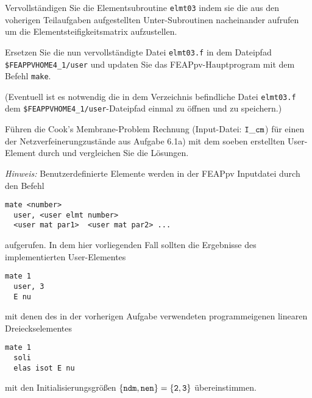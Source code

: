 \enab
\item Vervollständigen Sie die Elementsubroutine \verb|elmt03| indem sie die aus den voherigen Teilaufgaben aufgestellten Unter-Subroutinen nacheinander aufrufen um die Elementsteifigkeitsmatrix aufzustellen.
\item Ersetzen Sie die nun vervollständigte Datei \verb|elmt03.f| in dem Dateipfad \verb|$FEAPPVHOME4_1/user| und updaten Sie das FEAPpv-Hauptprogram mit dem Befehl \verb|make|.

(Eventuell ist es notwendig die in dem Verzeichnis befindliche Datei \verb|elmt03.f| dem \verb|$FEAPPVHOME4_1/user|-Dateipfad einmal zu öffnen und zu speichern.)
\item Führen die Cook's Membrane-Problem Rechnung (Input-Datei: $\tt I\_cm$) für einen der Netzverfeinerungzustände aus Aufgabe 6.1a) mit dem soeben erstellten User-Element durch und vergleichen Sie die Lösungen.
\enae

\textit{Hinweis:} Benutzerdefinierte Elemente werden in der FEAPpv Inputdatei durch den Befehl

\begin{verbatim}
mate <number>
  user, <user elmt number>
  <user mat par1>  <user mat par2> ...
\end{verbatim}

aufgerufen.
In dem hier vorliegenden Fall sollten die Ergebnisse des implementierten User-Elementes

\begin{verbatim}
mate 1
  user, 3
  E nu
\end{verbatim}

mit denen des in der vorherigen Aufgabe verwendeten programmeigenen linearen Dreieckselementes 

\begin{verbatim}
mate 1
  soli
  elas isot E nu  
\end{verbatim}

mit den Initialisierungsgrößen $\tt \{ndm,nen\}=\{2,3\}$ übereinstimmen.
